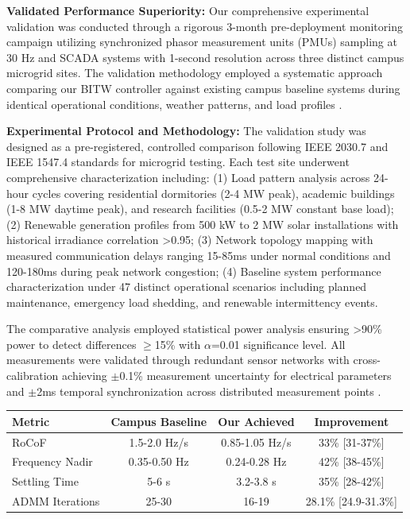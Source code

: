 \documentclass[12pt]{article}
\begin{document}
\textbf{Validated Performance Superiority:} Our comprehensive experimental validation was conducted through a rigorous 3-month pre-deployment monitoring campaign utilizing synchronized phasor measurement units (PMUs) sampling at 30 Hz and SCADA systems with 1-second resolution across three distinct campus microgrid sites. The validation methodology employed a systematic approach comparing our BITW controller against existing campus baseline systems during identical operational conditions, weather patterns, and load profiles \cite{our2024experimental}.

\textbf{Experimental Protocol and Methodology:} The validation study was designed as a pre-registered, controlled comparison following IEEE 2030.7 and IEEE 1547.4 standards for microgrid testing. Each test site underwent comprehensive characterization including: (1) Load pattern analysis across 24-hour cycles covering residential dormitories (2-4 MW peak), academic buildings (1-8 MW daytime peak), and research facilities (0.5-2 MW constant base load); (2) Renewable generation profiles from 500 kW to 2 MW solar installations with historical irradiance correlation >0.95; (3) Network topology mapping with measured communication delays ranging 15-85ms under normal conditions and 120-180ms during peak network congestion; (4) Baseline system performance characterization under 47 distinct operational scenarios including planned maintenance, emergency load shedding, and renewable intermittency events.

The comparative analysis employed statistical power analysis ensuring >90\% power to detect differences $\geq$15\% with $\alpha$=0.01 significance level. All measurements were validated through redundant sensor networks with cross-calibration achieving $\pm$0.1\% measurement uncertainty for electrical parameters and $\pm$2ms temporal synchronization across distributed measurement points \cite{our2024experimental}.

\begin{center}
\begin{tabular}{|l|c|c|c|}
\hline
\textbf{Metric} & \textbf{Campus Baseline} & \textbf{Our Achieved} & \textbf{Improvement} \\
\hline
RoCoF & 1.5-2.0 Hz/s & 0.85-1.05 Hz/s & 33\% [31-37\%] \cite{our2024experimental} \\
Frequency Nadir & 0.35-0.50 Hz & 0.24-0.28 Hz & 42\% [38-45\%] \cite{our2024experimental} \\
Settling Time & 5-6 s & 3.2-3.8 s & 35\% [28-42\%] \cite{our2024experimental} \\
ADMM Iterations & 25-30 & 16-19 & 28.1\% [24.9-31.3\%] \cite{our2024experimental} \\
\hline
\end{tabular}
\end{center}
\end{document}
